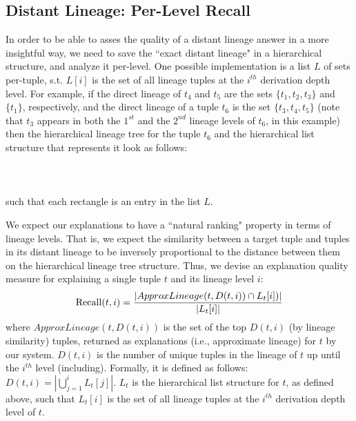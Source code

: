 \subsection{Distant Lineage: Per-Level Recall}
    In order to be able to asses the quality of a distant lineage answer in a more insightful way, we need to save the ``exact distant lineage" in a hierarchical structure, and analyze it per-level. One possible implementation is a list $L$ of sets per-tuple, s.t. $L[i]$ is the set of all lineage tuples at the $i^{th}$ derivation depth level. For example, if the direct lineage of $t_4$ and $t_5$ are the sets $\{t_1, t_2, t_3\}$ and $\{t_1\}$, respectively, and the direct lineage of a tuple $t_6$ is the set $\{t_3, t_4, t_5\}$ (note that $t_3$ appears in both the $1^{st}$ and the $2^{nd}$ lineage levels of $t_6$, in this example) then the hierarchical lineage tree for the tuple $t_6$ and the hierarchical list structure that represents it look as follows: \\\\
     \hspace{35pt}
     \\\\
such that each rectangle is an entry in the list $L$.
\par We expect our explanations to have a ``natural ranking" property in terms of lineage levels. That is, we expect the similarity between a target tuple and tuples in its distant lineage to be inversely proportional to the distance between them on the hierarchical lineage tree structure. Thus, we devise an explanation quality measure for explaining a single tuple $t$ and its lineage level $i$:
\begin{equation*}
    \operatorname{Recall}(t, i) = \frac{|ApproxLineage(t, D(t, i)) \cap L_t[i])|}{|L_t[i]|}\\
\end{equation*}
where $ApproxLineage(t, D(t, i))$ is the set of the top $D(t, i)$ (by lineage similarity) tuples, returned as explanations (i.e., approximate lineage) for $t$ by our system.
$D(t, i)$ is the number of unique tuples in the lineage of $t$ up until the $i^{th}$ level (including). Formally, it is defined as follows: $D(t, i) = |\bigcup\limits_{j=1}^{i} L_t[j]|$.
$L_t$ is the hierarchical list structure for $t$, as defined above, such that $L_t[i]$ is the set of all lineage tuples at the $i^{th}$ derivation depth level of $t$.\\

